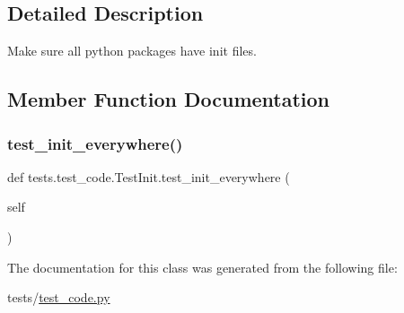 \subsection{Detailed Description}
\begin{DoxyVerb}Make sure all python packages have init files.
\end{DoxyVerb}
 

\subsection{Member Function Documentation}
\mbox{\label{classtests_1_1test__code_1_1TestInit_a8b97f4f48a8f21267c07578969c5612f}} 
\subsubsection{\texorpdfstring{test\+\_\+init\+\_\+everywhere()}{test\_init\_everywhere()}}
{\footnotesize\ttfamily def tests.\+test\+\_\+code.\+Test\+Init.\+test\+\_\+init\+\_\+everywhere (\begin{DoxyParamCaption}\item[{}]{self }\end{DoxyParamCaption})}



The documentation for this class was generated from the following file\+:\begin{DoxyCompactItemize}
\item 
tests/\hyperlink{test__code_8py}{test\+\_\+code.\+py}\end{DoxyCompactItemize}
